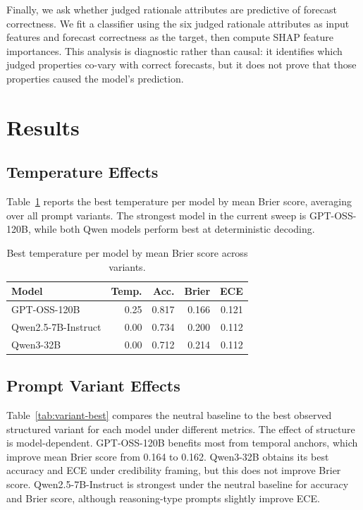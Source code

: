 \documentclass[11pt]{article}
\begin{document}
Finally, we ask whether judged rationale attributes are predictive of forecast correctness.
We fit a classifier using the six judged rationale attributes as input features and forecast correctness as the target, then compute SHAP feature importances.
This analysis is diagnostic rather than causal: it identifies which judged properties co-vary with correct forecasts, but it does not prove that those properties caused the model's prediction.

\section{Results}

\subsection{Temperature Effects}

Table~\ref{tab:temperature} reports the best temperature per model by mean Brier score, averaging over all prompt variants.
The strongest model in the current sweep is GPT-OSS-120B, while both Qwen models perform best at deterministic decoding.

\begin{table}[t]
\centering
\small
\begin{tabular}{lrrrr}
\toprule
Model & Temp. & Acc. & Brier & ECE \\
\midrule
GPT-OSS-120B & 0.25 & 0.817 & 0.166 & 0.121 \\
Qwen2.5-7B-Instruct & 0.00 & 0.734 & 0.200 & 0.112 \\
Qwen3-32B & 0.00 & 0.712 & 0.214 & 0.112 \\
\bottomrule
\end{tabular}
\caption{Best temperature per model by mean Brier score across variants.}
\label{tab:temperature}
\end{table}

\subsection{Prompt Variant Effects}

Table~\ref{tab:variant-best} compares the neutral baseline to the best observed structured variant for each model under different metrics.
The effect of structure is model-dependent.
GPT-OSS-120B benefits most from temporal anchors, which improve mean Brier score from 0.164 to 0.162.
Qwen3-32B obtains its best accuracy and ECE under credibility framing, but this does not improve Brier score.
Qwen2.5-7B-Instruct is strongest under the neutral baseline for accuracy and Brier score, although reasoning-type prompts slightly improve ECE.
\end{document}
